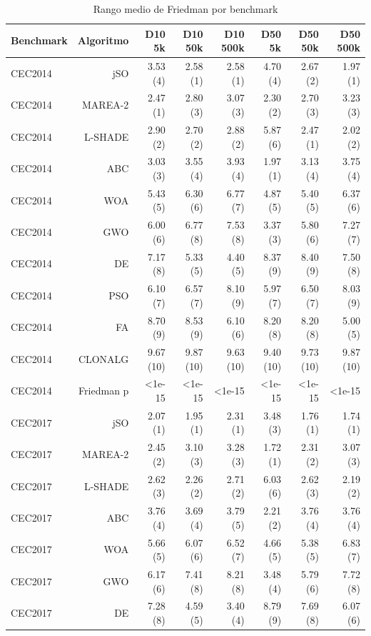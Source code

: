 \begin{table}[ht]\centering\small
\caption{Rango medio de Friedman por benchmark}
\begin{tabular}{lrrrrrrr}
\toprule
Benchmark & Algoritmo & D10 5k & D10 50k & D10 500k & D50 5k & D50 50k & D50 500k \\
\midrule
CEC2014 & jSO & 3.53 (4) & 2.58 (1) & 2.58 (1) & 4.70 (4) & 2.67 (2) & 1.97 (1) \\
CEC2014 & MAREA-2 & 2.47 (1) & 2.80 (3) & 3.07 (3) & 2.30 (2) & 2.70 (3) & 3.23 (3) \\
CEC2014 & L-SHADE & 2.90 (2) & 2.70 (2) & 2.88 (2) & 5.87 (6) & 2.47 (1) & 2.02 (2) \\
CEC2014 & ABC & 3.03 (3) & 3.55 (4) & 3.93 (4) & 1.97 (1) & 3.13 (4) & 3.75 (4) \\
CEC2014 & WOA & 5.43 (5) & 6.30 (6) & 6.77 (7) & 4.87 (5) & 5.40 (5) & 6.37 (6) \\
CEC2014 & GWO & 6.00 (6) & 6.77 (8) & 7.53 (8) & 3.37 (3) & 5.80 (6) & 7.27 (7) \\
CEC2014 & DE & 7.17 (8) & 5.33 (5) & 4.40 (5) & 8.37 (9) & 8.40 (9) & 7.50 (8) \\
CEC2014 & PSO & 6.10 (7) & 6.57 (7) & 8.10 (9) & 5.97 (7) & 6.50 (7) & 8.03 (9) \\
CEC2014 & FA & 8.70 (9) & 8.53 (9) & 6.10 (6) & 8.20 (8) & 8.20 (8) & 5.00 (5) \\
CEC2014 & CLONALG & 9.67 (10) & 9.87 (10) & 9.63 (10) & 9.40 (10) & 9.73 (10) & 9.87 (10) \\
CEC2014 & Friedman p & <1e-15 & <1e-15 & <1e-15 & <1e-15 & <1e-15 & <1e-15 \\
CEC2017 & jSO & 2.07 (1) & 1.95 (1) & 2.31 (1) & 3.48 (3) & 1.76 (1) & 1.74 (1) \\
CEC2017 & MAREA-2 & 2.45 (2) & 3.10 (3) & 3.28 (3) & 1.72 (1) & 2.31 (2) & 3.07 (3) \\
CEC2017 & L-SHADE & 2.62 (3) & 2.26 (2) & 2.71 (2) & 6.03 (6) & 2.62 (3) & 2.19 (2) \\
CEC2017 & ABC & 3.76 (4) & 3.69 (4) & 3.79 (5) & 2.21 (2) & 3.76 (4) & 3.76 (4) \\
CEC2017 & WOA & 5.66 (5) & 6.07 (6) & 6.52 (7) & 4.66 (5) & 5.38 (5) & 6.83 (7) \\
CEC2017 & GWO & 6.17 (6) & 7.41 (8) & 8.21 (8) & 3.48 (4) & 5.79 (6) & 7.72 (8) \\
CEC2017 & DE & 7.28 (8) & 4.59 (5) & 3.40 (4) & 8.79 (9) & 7.69 (8) & 6.07 (6) \\

\end{tabular}
\end{table}

